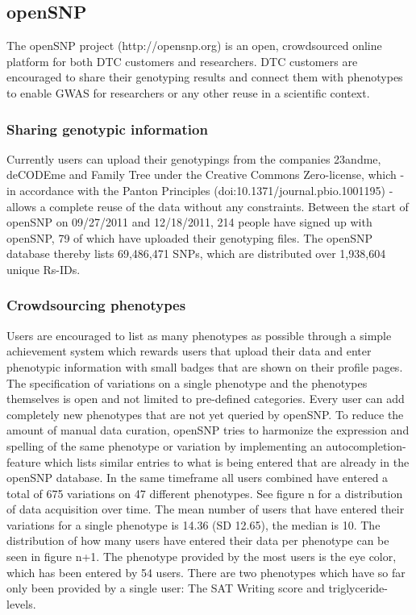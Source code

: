 \documentclass[10pt]{article}
\begin{document}
\subsection*{openSNP}

The openSNP project (http://opensnp.org) is an open, crowdsourced online platform for both DTC customers and researchers. DTC customers are encouraged to share their genotyping results and connect them with phenotypes to enable GWAS for researchers or any other reuse in a scientific context. 

\subsubsection*{Sharing genotypic information}
Currently users can upload their genotypings from the companies 23andme, deCODEme and Family Tree under the Creative Commons Zero-license, which - in accordance with the Panton Principles (doi:10.1371/journal.pbio.1001195) - allows a complete reuse of the data without any constraints.
Between the start of openSNP on 09/27/2011 and 12/18/2011, 214 people have signed up with openSNP, 79 of which have uploaded their genotyping files. The openSNP database thereby lists 69,486,471 SNPs, which are distributed over 1,938,604 unique Rs-IDs.
\subsubsection*{Crowdsourcing phenotypes}
Users are encouraged to list as many phenotypes as possible through a simple achievement system which rewards users that upload their data and enter phenotypic information with small badges that are shown on their profile pages. The specification of variations on a single phenotype and the phenotypes themselves is open and not limited to pre-defined categories. Every user can add completely new phenotypes that are not yet queried by openSNP. To reduce the amount of manual data curation, openSNP tries to harmonize the expression and spelling of the same phenotype or variation by implementing an autocompletion-feature which lists similar entries to what is being entered that are already in the openSNP database. In the same timeframe all users combined have entered a total of 675 variations on 47 different phenotypes. See figure n for a distribution of data acquisition over time.
The mean number of users that have entered their variations for a single phenotype is 14.36 (SD 12.65), the median is 10. The distribution of how many users have entered their data per phenotype can be seen in figure n+1. The phenotype provided by the most users is the eye color, which has been entered by 54 users. There are two phenotypes which have so far only been provided by a single user: The SAT Writing score and triglyceride-levels.
\end{document}
